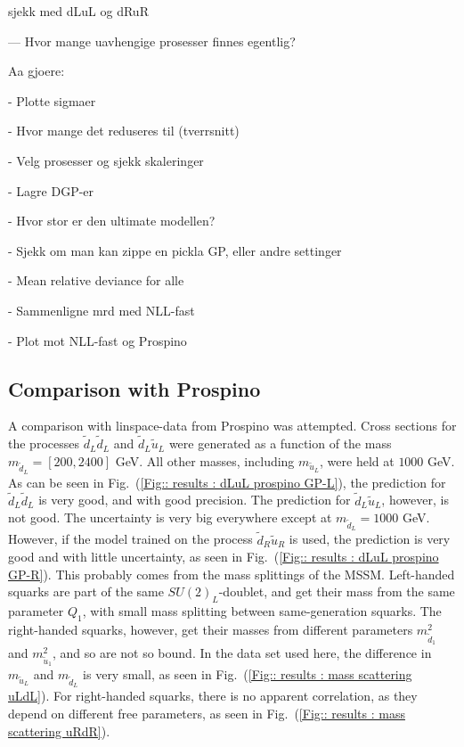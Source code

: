 \documentclass[twoside,english]{uiofysmaster}
\begin{document}
sjekk med dLuL og dRuR

--- Hvor mange uavhengige prosesser finnes egentlig?


Aa gjoere:

- Plotte sigmaer

- Hvor mange det reduseres til (tverrsnitt)

- Velg prosesser og sjekk skaleringer

- Lagre DGP-er

- Hvor stor er den ultimate modellen?

- Sjekk om man kan zippe en pickla GP, eller andre settinger

- Mean relative deviance for alle

- Sammenligne mrd med NLL-fast

- Plot mot NLL-fast og Prospino

\subsection{Comparison with Prospino}

A comparison with linspace-data from Prospino was attempted. Cross sections for the processes $\tilde{d}_L \tilde{d}_L$ and $\tilde{d}_L \tilde{u}_L$ were generated as a function of the mass $m_{\tilde{d}_L}=[200, 2400]$ GeV. All other masses, including $m_{\tilde{u}_L}$, were held at $1000$ GeV. As can be seen in Fig.\ (\ref{Fig:: results : dLuL prospino GP-L}), the prediction for $\tilde{d}_L \tilde{d}_L$ is very good, and with good precision. The prediction for $\tilde{d}_L \tilde{u}_L$, however, is not good. The uncertainty is very big everywhere except at $m_{\tilde{d}_L} = 1000$ GeV. However, if the model trained on the process $\tilde{d}_R \tilde{u}_R$ is used, the prediction is very good and with little uncertainty, as seen in Fig.\ (\ref{Fig:: results : dLuL prospino GP-R}). This probably comes from the mass splittings of the MSSM. Left-handed squarks are part of the same $SU(2)_L$-doublet, and get their mass from the same parameter $Q_1$, with small mass splitting between same-generation squarks. The right-handed squarks, however, get their masses from different parameters $m_{\tilde{d}_1}^2$ and $m_{\tilde{u}_1}^2$, and so are not so bound. In the data set used here, the difference in $m_{\tilde{u}_L}$ and $m_{\tilde{d}_L}$ is very small, as seen in Fig.\ (\ref{Fig:: results : mass scattering uLdL}). For right-handed squarks, there is no apparent correlation, as they depend on different free parameters, as seen in Fig.\ (\ref{Fig:: results : mass scattering uRdR}). 
\end{document}
